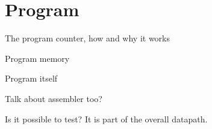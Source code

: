 
\section{Program}

The program counter, how and why it works

Program memory

Program itself

Talk about assembler too?

Is it possible to test? It is part of the overall datapath.
